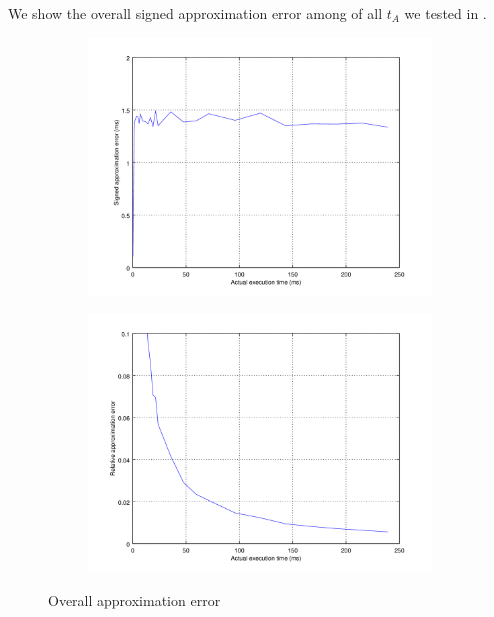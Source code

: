 We show the overall signed approximation error among of all $t_A$ we tested in .

\begin{figure}[ht!]
	\center
	\begin{subfigure}{0.45\linewidth}
		\center
		\includegraphics[width=1\linewidth]{fig/esterr.png}
	\end{subfigure}
	\begin{subfigure}{0.45\linewidth}
		\center
		\includegraphics[width=\linewidth]{fig/rtvesterr.png}
	\end{subfigure}
	\caption{Overall approximation error}
	\label{Fig: Overall approximation error}
\end{figure}

